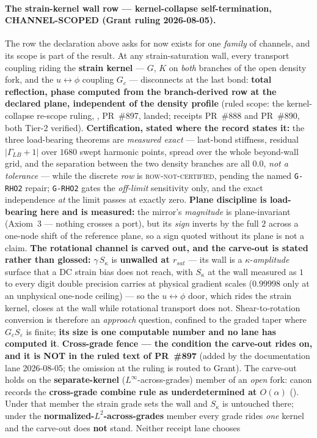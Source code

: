 \paragraph{The strain-kernel wall row --- kernel-collapse self-termination, CHANNEL-SCOPED (Grant ruling 2026-08-05).} The row the declaration above asks for now exists for one \emph{family} of channels, and its scope is part of the result. At any strain-saturation wall, every transport coupling riding the \textbf{strain kernel} --- $G$, $K$ on \emph{both} branches of the open density fork, and the $u \leftrightarrow \phi$ coupling $G_c$ --- disconnects at the last bond: \textbf{total reflection, phase computed from the branch-derived row at the declared plane, independent of the density profile} (ruled scope: the kernel-collapse re-scope ruling, , PR~\#897, landed; receipts PR~\#888 and PR~\#890, both Tier-2 verified). \textbf{Certification, stated where the record states it:} the three load-bearing theorems are \emph{measured exact} --- last-bond stiffness, residual $\lvert\Gamma_{LB}+1\rvert$ over $1680$ swept harmonic points, spread over the whole beyond-wall grid, and the separation between the two density branches are all $0.0$, \emph{not a tolerance} --- while the discrete \emph{row} is \textsc{row-not-certified}, pending the named \texttt{G-RHO2} repair; \texttt{G-RHO2} gates the \emph{off-limit} sensitivity only, and the exact independence \emph{at} the limit passes at exactly zero. \textbf{Plane discipline is load-bearing here and is measured:} the mirror's \emph{magnitude} is plane-invariant (Axiom~3 --- nothing crosses a port), but its \emph{sign} inverts by the full $2$ across a one-node shift of the reference plane, so a sign quoted without its plane is not a claim. \textbf{The rotational channel is carved out, and the carve-out is stated rather than glossed:} $\gamma\,S_\kappa$ is \textbf{unwalled at $r_{sat}$} --- its wall is a $\kappa$-\emph{amplitude} surface that a DC strain bias does not reach, with $S_\kappa$ at the wall measured as $1$ to every digit double precision carries at physical gradient scales ($0.99998$ only at an unphysical one-node ceiling) --- so the $u \leftrightarrow \phi$ door, which rides the strain kernel, closes at the wall while rotational transport does not. Shear-to-rotation conversion is therefore an \emph{approach} question, confined to the graded taper where $G_c S_\varepsilon$ is finite; \textbf{its size is one computable number and no lane has computed it}. \textbf{Cross-grade fence --- the condition the carve-out rides on, and it is NOT in the ruled text of PR~\#897} (added by the documentation lane 2026-08-05; the omission at the ruling is routed to Grant). The carve-out holds on the \textbf{separate-kernel} ($L^\infty$-across-grades) member of an \emph{open} fork: canon records the \textbf{cross-grade combine rule as underdetermined at $O(\alpha)$} (). Under that member the strain grade sets the wall and $S_\kappa$ is untouched there; under the \textbf{normalized-$L^2$-across-grades} member every grade rides \emph{one} kernel and the carve-out does \textbf{not} stand. Neither receipt lane chooses 